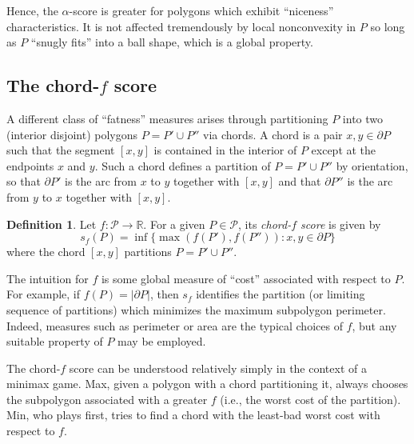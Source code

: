 \documentclass[draft]{jocg}
\newcommand{\RR}{\mathbb{R}}
\newcommand{\set}[1]{\{#1\}}
\newcommand{\abs}[1]{|#1|}
\theoremstyle{definition}
\newtheorem{definition}[proposition]{Definition}
\theoremstyle{remark}
\begin{document}
Hence, the $\alpha$-score is greater for polygons which exhibit ``niceness''
characteristics. It is not affected tremendously by local nonconvexity in $P$ so
long as $P$ ``snugly fits'' into a ball shape, which is a global property.

\subsection{The chord-$f$ score}

A different class of ``fatness'' measures arises through partitioning $P$ into
two (interior disjoint) polygons $P = P' \cup P''$ via chords. A chord is a pair
$x,y \in \partial P$ such that the segment $[x,y]$ is contained in the interior
of $P$ except at the endpoints $x$ and $y$. Such a chord defines a partition of
$P = P' \cup P''$ by orientation, so that $\partial P'$ is the arc from $x$ to
$y$ together with $[x,y]$ and that $\partial P''$ is the arc from $y$ to $x$
together with $[x,y]$.

\begin{definition}
  Let $f : \mathcal{P} \to \RR$. For a given $P \in \mathcal{P}$, its
  \emph{chord-$f$ score} is given by
  \begin{equation*}
    s_f (P) = \inf \set{\max(f(P'), f(P'')) : x, y \in \partial P}
  \end{equation*}
  where the chord $[x,y]$ partitions $P = P' \cup P''$.
  \label{def:chord-f}
\end{definition}

The intuition for $f$ is some global measure of ``cost'' associated with respect
to $P$. For example, if $f(P) = \abs{\partial P}$, then $s_f$ identifies the
partition (or limiting sequence of partitions) which minimizes the maximum
subpolygon perimeter. Indeed, measures such as perimeter or area are the typical
choices of $f$, but any suitable property of $P$  may be employed. 

The chord-$f$ score can be understood relatively simply in the context of a
minimax game. Max, given a polygon with a chord partitioning it, always chooses
the subpolygon associated with a greater $f$ (i.e., the worst cost of the
partition). Min, who plays first, tries to find a chord with the least-bad worst
cost with respect to $f$.
\end{document}
